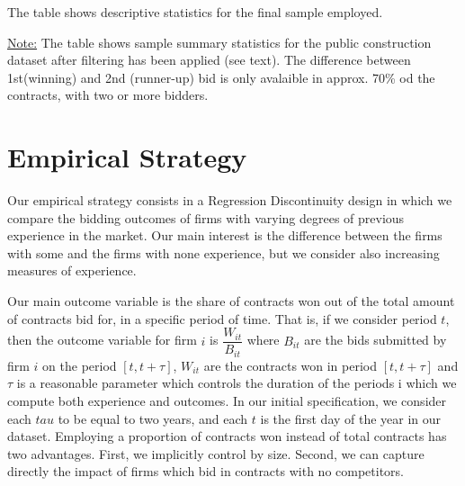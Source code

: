 The table shows descriptive statistics for the final sample employed.
\begin{table}[!h]

\caption{Descriptive Statistics}
\centering
{}
\vskip 0.5mm
{\raggedright \footnotesize \underline{Note:} The table shows sample summary statistics for the public construction dataset after filtering has been applied (see text). The difference between 1st(winning) and 2nd (runner-up) bid is only avalaible in approx. 70\% od the contracts, with two or more bidders. \par}
\end{table}



\section{Empirical Strategy}
Our empirical strategy consists in a Regression Discontinuity design in which we compare the bidding outcomes of firms with varying degrees of previous experience in the market. Our main interest is the difference between the firms with some and the firms with none experience, but we consider also increasing measures of experience.

Our main outcome variable is the share of contracts won out of the total amount of contracts bid for, in a specific period of time. That is, if we consider period $t$, then the outcome variable for firm $i$ is $\dfrac{W_{it}}{B_{it}}$ where $B_{it}$ are the bids submitted by firm $i$ on the period $[t,t+\tau]$, $W_{it}$ are the contracts won in period $[t,t+\tau]$ and $\tau$ is a reasonable parameter which controls the duration of the periods i which we compute both experience and outcomes. In our initial specification, we consider each $tau$ to be equal to two years, and each $t$ is the first day of the year in our dataset. Employing a proportion of contracts won instead of total contracts has two advantages. First, we implicitly control by size. Second, we can capture directly the impact of firms which bid in contracts with no competitors.

